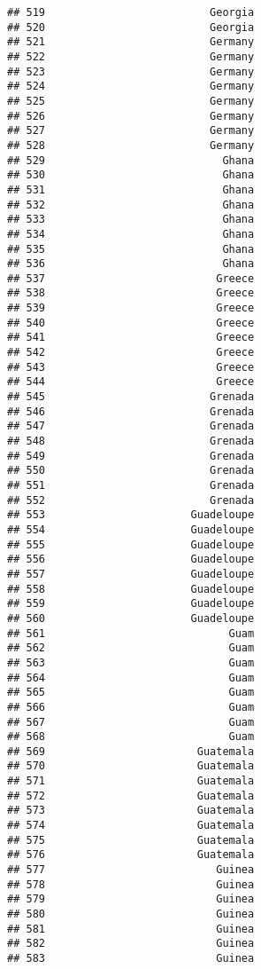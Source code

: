 \documentclass[]{article}
\begin{document}
\begin{verbatim}
## 519                          Georgia
## 520                          Georgia
## 521                          Germany
## 522                          Germany
## 523                          Germany
## 524                          Germany
## 525                          Germany
## 526                          Germany
## 527                          Germany
## 528                          Germany
## 529                            Ghana
## 530                            Ghana
## 531                            Ghana
## 532                            Ghana
## 533                            Ghana
## 534                            Ghana
## 535                            Ghana
## 536                            Ghana
## 537                           Greece
## 538                           Greece
## 539                           Greece
## 540                           Greece
## 541                           Greece
## 542                           Greece
## 543                           Greece
## 544                           Greece
## 545                          Grenada
## 546                          Grenada
## 547                          Grenada
## 548                          Grenada
## 549                          Grenada
## 550                          Grenada
## 551                          Grenada
## 552                          Grenada
## 553                       Guadeloupe
## 554                       Guadeloupe
## 555                       Guadeloupe
## 556                       Guadeloupe
## 557                       Guadeloupe
## 558                       Guadeloupe
## 559                       Guadeloupe
## 560                       Guadeloupe
## 561                             Guam
## 562                             Guam
## 563                             Guam
## 564                             Guam
## 565                             Guam
## 566                             Guam
## 567                             Guam
## 568                             Guam
## 569                        Guatemala
## 570                        Guatemala
## 571                        Guatemala
## 572                        Guatemala
## 573                        Guatemala
## 574                        Guatemala
## 575                        Guatemala
## 576                        Guatemala
## 577                           Guinea
## 578                           Guinea
## 579                           Guinea
## 580                           Guinea
## 581                           Guinea
## 582                           Guinea
## 583                           Guinea

\end{verbatim}
\end{document}

